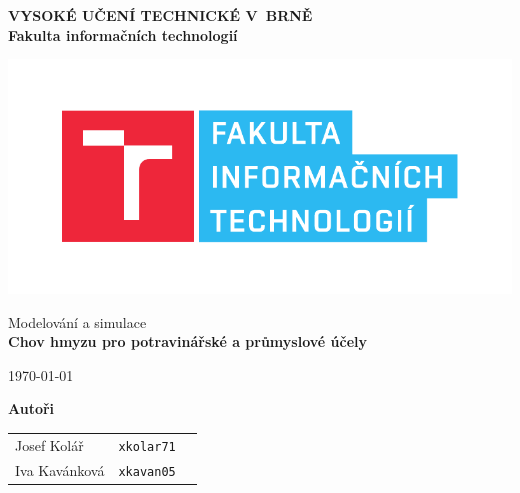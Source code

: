 
\begin{titlepage}

    \centering

    {\fontsize{20pt}{15pt}\bfseries
    VYSOKÉ UČENÍ TECHNICKÉ V~BRNĚ\\
    \vspace{8pt}
    Fakulta informačních technologií
    }

    \includegraphics[scale=0.7]{./assets/fit-logo.pdf}

    \vspace{22pt}

    {\Large Modelování a simulace\\}
    \vspace{4pt}
    {\LARGE \bfseries Chov hmyzu pro potravinářské a průmyslové účely}

    \vspace{180pt}
    {\Large \today}

    \vspace{90pt}
    {\Large \bfseries Autoři\\}
    \vspace{12pt}

    \begin{tabular}{ l c r }
        Josef Kolář & \texttt{xkolar71} \\
        Iva Kavánková & \texttt{xkavan05} \\
    \end{tabular}\\

\end{titlepage}